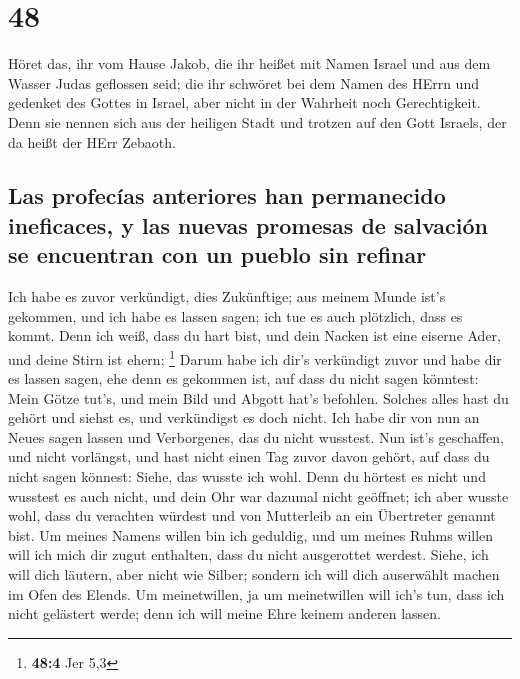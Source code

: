 \hypertarget{section-47}{%
\section{48}\label{section-47}}

 Höret das, ihr vom Hause Jakob, die ihr heißet mit Namen
Israel und aus dem Wasser Judas geflossen seid; die ihr schwöret bei dem
Namen des HErrn und gedenket des Gottes in Israel, aber nicht in der
Wahrheit noch Gerechtigkeit.  Denn sie nennen sich aus der
heiligen Stadt und trotzen auf den Gott Israels, der da heißt der HErr
Zebaoth.

\hypertarget{las-profecuxedas-anteriores-han-permanecido-ineficaces-y-las-nuevas-promesas-de-salvaciuxf3n-se-encuentran-con-un-pueblo-sin-refinar}{%
\subsection{Las profecías anteriores han permanecido ineficaces, y las
nuevas promesas de salvación se encuentran con un pueblo sin
refinar}\label{las-profecuxedas-anteriores-han-permanecido-ineficaces-y-las-nuevas-promesas-de-salvaciuxf3n-se-encuentran-con-un-pueblo-sin-refinar}}

 Ich habe es zuvor verkündigt, dies Zukünftige; aus meinem
Munde ist's gekommen, und ich habe es lassen sagen; ich tue es auch
plötzlich, dass es kommt.  Denn ich weiß, dass du hart
bist, und dein Nacken ist eine eiserne Ader, und deine Stirn ist ehern;
\footnote{\textbf{48:4} Jer 5,3}  Darum habe ich dir's
verkündigt zuvor und habe dir es lassen sagen, ehe denn es gekommen ist,
auf dass du nicht sagen könntest: Mein Götze tut's, und mein Bild und
Abgott hat's befohlen.  Solches alles hast du gehört und
siehst es, und verkündigst es doch nicht. Ich habe dir von nun an Neues
sagen lassen und Verborgenes, das du nicht wusstest.  Nun
ist's geschaffen, und nicht vorlängst, und hast nicht einen Tag zuvor
davon gehört, auf dass du nicht sagen könnest: Siehe, das wusste ich
wohl.  Denn du hörtest es nicht und wusstest es auch
nicht, und dein Ohr war dazumal nicht geöffnet; ich aber wusste wohl,
dass du verachten würdest und von Mutterleib an ein Übertreter genannt
bist.  Um meines Namens willen bin ich geduldig, und um
meines Ruhms willen will ich mich dir zugut enthalten, dass du nicht
ausgerottet werdest.  Siehe, ich will dich läutern, aber
nicht wie Silber; sondern ich will dich auserwählt machen im Ofen des
Elends.  Um meinetwillen, ja um meinetwillen will ich's
tun, dass ich nicht gelästert werde; denn ich will meine Ehre keinem
anderen lassen.

